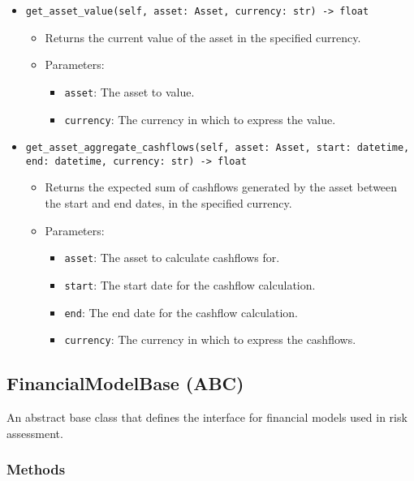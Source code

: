 \documentclass{article}
\begin{document}
\begin{itemize}
    \item \texttt{get\_asset\_value(self, asset: Asset, currency: str) -> float}
    \begin{itemize}
        \item Returns the current value of the asset in the specified currency.
        \item Parameters:
        \begin{itemize}
            \item \texttt{asset}: The asset to value.
            \item \texttt{currency}: The currency in which to express the value.
        \end{itemize}
    \end{itemize}

    \item \texttt{get\_asset\_aggregate\_cashflows(self, asset: Asset, start: datetime, end: datetime, currency: str) -> float}
    \begin{itemize}
        \item Returns the expected sum of cashflows generated by the asset between the start and end dates, in the specified currency.
        \item Parameters:
        \begin{itemize}
            \item \texttt{asset}: The asset to calculate cashflows for.
            \item \texttt{start}: The start date for the cashflow calculation.
            \item \texttt{end}: The end date for the cashflow calculation.
            \item \texttt{currency}: The currency in which to express the cashflows.
        \end{itemize}
    \end{itemize}
\end{itemize}

\subsection{FinancialModelBase (ABC)}

An abstract base class that defines the interface for financial models used in risk assessment.

\subsubsection{Methods}
\end{document}
